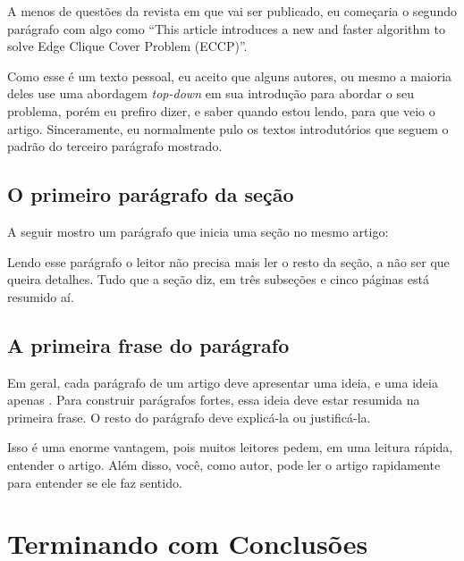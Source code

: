 \documentclass[openany]{book}
\begin{document}
A menos de questões da revista em que vai ser publicado, eu começaria o segundo parágrafo com algo como \enquote{This article introduces a new and faster algorithm to solve Edge Clique Cover Problem (ECCP)}.

Como esse é um texto pessoal, eu aceito que alguns autores, ou mesmo a maioria deles use uma abordagem \textit{top-down} em sua introdução para abordar o seu problema, porém eu prefiro dizer, e saber quando estou lendo, para que veio o artigo. Sinceramente, eu normalmente pulo os textos introdutórios que seguem o padrão do terceiro parágrafo mostrado.

\section{O primeiro parágrafo da seção}

  A seguir mostro um parágrafo que inicia uma seção no mesmo artigo:


Lendo esse parágrafo o leitor não precisa mais ler o resto da seção, a não ser que queira detalhes. Tudo que a seção diz, em três subseções e cinco páginas está resumido aí.

\section{A primeira frase do parágrafo}

 Em geral, cada parágrafo de um artigo deve apresentar uma ideia, e uma ideia apenas . Para construir parágrafos fortes, essa ideia deve estar resumida na primeira frase. O resto do parágrafo deve explicá-la ou justificá-la.

 Isso é uma enorme vantagem, pois muitos leitores pedem, em uma leitura rápida, entender o artigo. Além disso, você, como autor, pode ler o artigo rapidamente para entender se ele faz sentido.

\chapter{Terminando com Conclusões}
\end{document}

